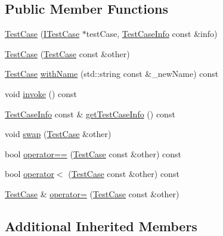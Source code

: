 \subsection*{Public Member Functions}
\begin{DoxyCompactItemize}
\item 
\hyperlink{class_catch_1_1_test_case_a03a5b913484681bd6d398dc5e9c2a907}{Test\-Case} (\hyperlink{struct_catch_1_1_i_test_case}{I\-Test\-Case} $\ast$test\-Case, \hyperlink{struct_catch_1_1_test_case_info}{Test\-Case\-Info} const \&info)
\item 
\hyperlink{class_catch_1_1_test_case_ac0011d3789edc3e44edb41f13c4775a0}{Test\-Case} (\hyperlink{class_catch_1_1_test_case}{Test\-Case} const \&other)
\item 
\hyperlink{class_catch_1_1_test_case}{Test\-Case} \hyperlink{class_catch_1_1_test_case_ab6dbc6c82b7c1680013c67bdedccfc8e}{with\-Name} (std\-::string const \&\-\_\-new\-Name) const 
\item 
void \hyperlink{class_catch_1_1_test_case_aac2e028135cc88c3e3aac04650960a6c}{invoke} () const 
\item 
\hyperlink{struct_catch_1_1_test_case_info}{Test\-Case\-Info} const \& \hyperlink{class_catch_1_1_test_case_a25c03661ab092431cdff10df5c58a5a7}{get\-Test\-Case\-Info} () const 
\item 
void \hyperlink{class_catch_1_1_test_case_aee38f908faf10b905b209ca388275413}{swap} (\hyperlink{class_catch_1_1_test_case}{Test\-Case} \&other)
\item 
bool \hyperlink{class_catch_1_1_test_case_a40eab521b316c7d476f6b4dd1c33eec8}{operator==} (\hyperlink{class_catch_1_1_test_case}{Test\-Case} const \&other) const 
\item 
bool \hyperlink{class_catch_1_1_test_case_aa5174e85e3aac6e7398dee9c76730324}{operator$<$} (\hyperlink{class_catch_1_1_test_case}{Test\-Case} const \&other) const 
\item 
\hyperlink{class_catch_1_1_test_case}{Test\-Case} \& \hyperlink{class_catch_1_1_test_case_a8022e3f74232f7887d2d2cbbc8876502}{operator=} (\hyperlink{class_catch_1_1_test_case}{Test\-Case} const \&other)
\end{DoxyCompactItemize}
\subsection*{Additional Inherited Members}


